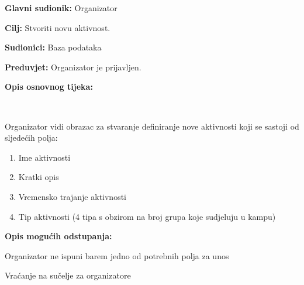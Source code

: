 \pagebreak
\noindent {}
\begin{packed_item}

	\item \textbf{Glavni sudionik: }Organizator
	\item  \textbf{Cilj:} Stvoriti novu aktivnost.
	\item  \textbf{Sudionici:} Baza podataka
	\item  \textbf{Preduvjet:} Organizator je prijavljen.
	\item  \textbf{Opis osnovnog tijeka:}

	\item[] \begin{packed_enum}

				\ \item Organizator vidi obrazac za stvaranje definiranje nove aktivnosti koji se            sastoji od sljedećih polja:
				\begin{enumerate}
					\item Ime aktivnosti
					\item Kratki opis
					\item Vremensko trajanje aktivnosti
					\item Tip aktivnosti (4 tipa s obzirom na broj grupa koje sudjeluju u kampu)
				\end{enumerate}
	\end{packed_enum}

	\item  \textbf{Opis mogućih odstupanja:}

	\item[] \begin{packed_item}

				\item[2.a] \item Organizator ne ispuni barem jedno od potrebnih polja za unos
				\item[] \begin{packed_enum}

							\item Vraćanje na sučelje za organizatore


				\end{packed_enum}


	\end{packed_item}
\end{packed_item}
\vspace{5mm} %

